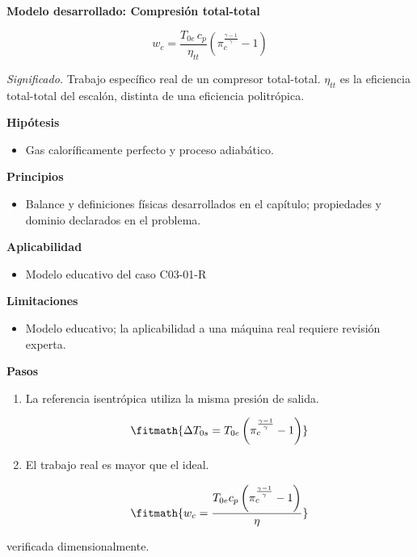 \documentclass[10pt,openany]{book}
\begin{document}
\begin{tcolorbox}[title={Desarrollos del modelo}, studiumdef, breakable]

\noindent\textbf{Modelo desarrollado: Compresión total-total}

\begin{equation}
w_c=\frac{T_{0e}\,c_p}{\eta_{tt}}\left(\pi_c^{\frac{\gamma-1}{\gamma}}-1\right)
\label{eq:EC-C03}
\end{equation}

\noindent\textit{Significado.} Trabajo específico real de un compresor total-total. $\eta_{tt}$ es la eficiencia total-total del escalón, distinta de una eficiencia politrópica.

\noindent\textbf{Hipótesis}
\begin{itemize}
\item Gas caloríficamente perfecto y proceso adiabático.
\end{itemize}

\noindent\textbf{Principios}
\begin{itemize}
\item Balance y definiciones físicas desarrollados en el capítulo; propiedades y dominio declarados en el problema.
\end{itemize}

\noindent\textbf{Aplicabilidad}
\begin{itemize}
\item Modelo educativo del caso C03-01-R
\end{itemize}

\noindent\textbf{Limitaciones}
\begin{itemize}
\item Modelo educativo; la aplicabilidad a una máquina real requiere revisión experta.
\end{itemize}

\noindent\textbf{Pasos}
\begin{enumerate}
\item
La referencia isentrópica utiliza la misma presión de salida.

\[
\fitmath{\Delta T_{0s}=T_{0e} \left(\pi_c^{\frac{\gamma - 1}{\gamma}} - 1\right)}
\]
\item
El trabajo real es mayor que el ideal.

\[
\fitmath{w_c=\frac{T_{0e} c_p \left(\pi_c^{\frac{\gamma - 1}{\gamma}} - 1\right)}{\eta}}
\]
\end{enumerate}

{\noindent\footnotesize verificada dimensionalmente.\par}
\end{tcolorbox}
\end{document}
